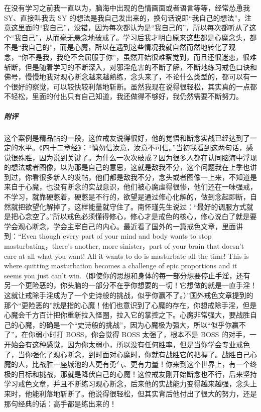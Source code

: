 \begin{case}
    在没有学习之前我一直以为，脑海中出现的色情画面或者语言等等，经常怂恿我 SY、直接叫我去 SY 的想法是我自己发出来的，换句话说即“我自己的想法”，注意这里面的“我自己”，没错，因为每次都认为是“我自己的”，所以每次都听从了这个“我自己”，从而毫无悬念地破戒了。学习后我才明白原来这些都是心魔念头，都不是“我自己的”，而是心魔，所以在遇到这些情况我就自然而然地转化了观念，“你不是我，我绝不会屈服于你”，虽然开始很难察觉到，而且还很迷恋，很难斩断，但是随着学习的不断深入，对邪淫危害的不断了解，不断地练习戒色口诀和佛号，慢慢地我对观心断念越来越熟练，念头来了，不论什么类型的，都可以有一个很好的察觉，可以较快较利落地斩断。虽然我现在说得很轻松，其实真的一点都不轻松，里面的付出只有自己知道，我还做得不够好，我仍然需要不断努力。
    \subparagraph{附评} 这个案例是精品帖的一段，这位戒友说得很好，他的觉悟和断念实战已经达到了一定的水平。《四十二章经》：“慎勿信汝意，汝意不可信。”当初我看到这两句话，感觉很殊胜，因为说到关键了。为什么一次次破戒？因为很多人都在认同脑海中浮现的想法或者图像，以为那是自己的意思，这就是敌我不分，这个问题我在上季也讲到过，你看很多新人的发帖，他们都是敌我不分，念头或者图像一上来，不知道是来自于心魔，也没有断念的实战意识，他们被心魔虐得很惨，他们还在一味强戒，不学习，就靠硬憋着，硬憋是不行的，欲望是通过修心化解的，做到念起即断，自然就把欲望化解掉了，这样能量就守住了。南怀瑾先生说过：“最好的调服方式就是把心念空了。”所以戒色必须懂得修心，修心才是戒色的核心，修心说白了就是要学会观心断念，学会主宰自己的内心。最近看了国外的一篇戒色文章，里面讲到：“Even though every part of your mind and body wants to stop masturbating，there's another, more sinister，part of your brain that doesn't care at all what you want! All it wants to do is masturbate all the time! This is where quitting masturbation becomes a challenge of epic proportions and it seems you just can't win.（即使你的思想和身体的每一部分想要停止手淫，还有另一个更险恶的，你头脑的一部分不在乎你想要的一切！它想做的就是一直手淫！这就让戒除手淫成为了一个史诗般的挑战，似乎你赢不了。）”国外戒色文章提到的那个“更险恶的”就是指的心魔！他们也意识到了心魔的存在，你想戒除手淫，但是心魔会千方百计把你重新拉入怪圈，拉入它的掌控之下。心魔非常强大，要战胜自己的心魔，的确是一个“史诗般的挑战”，因为心魔极为强大，所以“似乎你赢不了”，在你弱小时打 BOSS，你会觉得 BOSS 太强了，根本不是 BOSS 的对手，一开始会有这种感觉，因为你太弱小，所以没有任何胜率，但是当你学会专业戒色了，当你强化了观心断念，到时面对心魔时，你就有战胜它的把握了。战胜自己心魔的人，比战胜一座城池的人更有勇气、更有力量！你来到这个世界上，有一个终极的目标和挑战，那就是降伏自己的心魔！这位戒友刚开始断念也不行，后来坚持学习戒色文章，并且不断练习观心断念，后来他的实战能力变得越来越强，念头上来时，他能利落地斩断了。他说得很轻松，但其实背后他付出了很大的努力，还是那句经典的话：高手都是练出来的！
\end{case}

